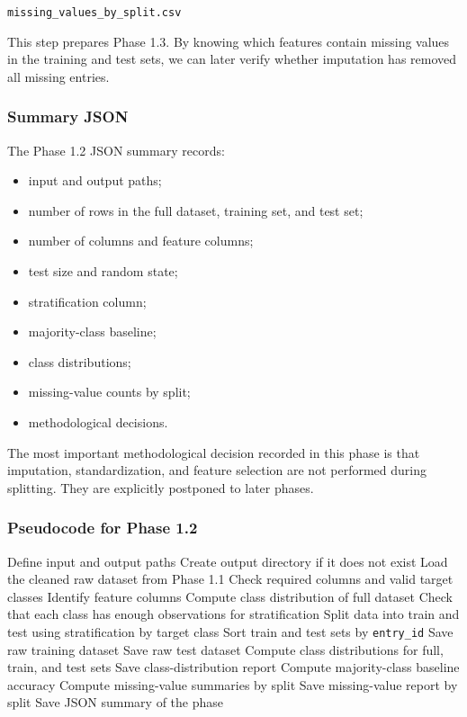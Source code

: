 \documentclass{ipgpmaster}
\begin{document}
\begin{center}
\texttt{missing\_values\_by\_split.csv}
\end{center}

This step prepares Phase 1.3. By knowing which features contain missing values in the training and test sets, we can later verify whether imputation has removed all missing entries.

\subsubsection{Summary JSON}

The Phase 1.2 JSON summary records:

\begin{itemize}
    \item input and output paths;
    \item number of rows in the full dataset, training set, and test set;
    \item number of columns and feature columns;
    \item test size and random state;
    \item stratification column;
    \item majority-class baseline;
    \item class distributions;
    \item missing-value counts by split;
    \item methodological decisions.
\end{itemize}

The most important methodological decision recorded in this phase is that imputation, standardization, and feature selection are not performed during splitting. They are explicitly postponed to later phases.

\subsubsection{Pseudocode for Phase 1.2}

\begin{algorithm}[H]
\caption{Phase 1.2: Stratified train--test split}
\begin{algorithmic}[1]
\State Define input and output paths
\State Create output directory if it does not exist
\State Load the cleaned raw dataset from Phase 1.1
\State Check required columns and valid target classes
\State Identify feature columns
\State Compute class distribution of full dataset
\State Check that each class has enough observations for stratification
\State Split data into train and test using stratification by target class
\State Sort train and test sets by \texttt{entry\_id}
\State Save raw training dataset
\State Save raw test dataset
\State Compute class distributions for full, train, and test sets
\State Save class-distribution report
\State Compute majority-class baseline accuracy
\State Compute missing-value summaries by split
\State Save missing-value report by split
\State Save JSON summary of the phase
\end{algorithmic}
\end{algorithm}
\end{document}
